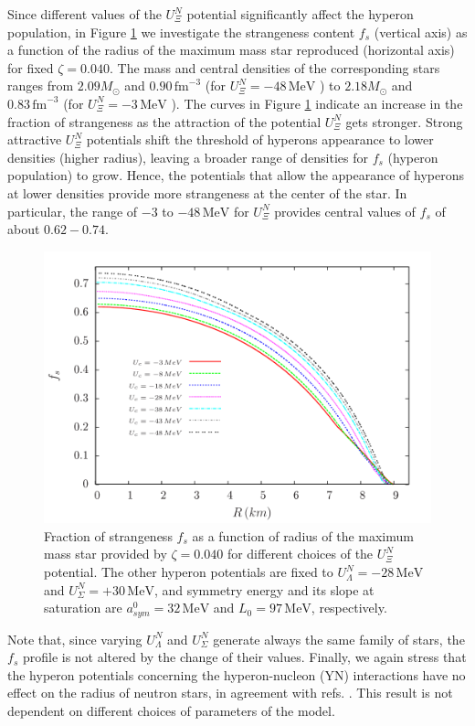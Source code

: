 \documentclass[twocolumn,showpacs,aps]{revtex4}
\begin{document}
Since different values of the $U_{\Xi}^N$ potential significantly affect the hyperon population, 
in Figure \ref{fs_Uc} we investigate the strangeness content $f_s$ (vertical axis) as a function of the radius of 
the maximum mass star reproduced (horizontal axis) for fixed $\zeta=0.040$. 
The mass and central densities of the corresponding stars ranges from $2.09M_{\odot}$ and $0.90\,\mathrm{fm}^{-3}$
  (for $U_{\Xi}^N=-48\, \mathrm{MeV}$
 ) 
to $2.18M_{\odot}$ and $0.83\,\mathrm{fm}^{-3}$
  (for $U_{\Xi}^N=-3\, \mathrm{MeV}$
 ). 
The curves in Figure \ref{fs_Uc} indicate an increase in the fraction of strangeness as the attraction of 
the potential $U_{\Xi}^N$ gets stronger. 
Strong attractive $U_{\Xi}^N$ potentials shift the threshold of hyperons appearance to lower densities (higher radius),
leaving a broader range of densities for $f_s$ (hyperon population) to grow. 
Hence, the potentials that allow the appearance of hyperons at lower densities provide 
more strangeness at the center of the star. 
In particular, the range of $-3$ to $-48\, \mathrm{MeV}$
  for $U_{\Xi}^N$ provides central values of $f_s$ of about $0.62-0.74$.
  \begin{figure}
 \centering
 \vspace{1.0cm}
 \includegraphics[width=9.cm]{fs_paper_Uc.png}
 \caption{\label{fs_Uc} Fraction of strangeness $f_s$ as a function of radius of the maximum mass star provided by $\zeta=0.040$ 
for different choices of the $U_{\Xi}^N$ potential. 
The other hyperon potentials are fixed to $U_{\Lambda}^N=-28\, \mathrm{MeV}$ and $U_{\Sigma}^N=+30\, \mathrm{MeV} $, 
 and symmetry energy and its slope at saturation are $a_{sym}^0= 32\, \mathrm{MeV}$ and $L_0=97\, \mathrm{MeV}$, respectively.}
 \end{figure}
 
Note that, since varying $U_{\Lambda}^N$ and $U_{\Sigma}^N$ generate always the same 
family of stars, the $f_s$ profile is not altered by the change of their values.
Finally, we again stress that the hyperon potentials concerning the hyperon-nucleon (YN) interactions have 
no effect on the radius of neutron stars, in agreement with refs. \cite{Weissenborn:2011kb, Bhowmick:2014pma}. 
This result is not dependent on different choices of parameters of the model.
\end{document}
